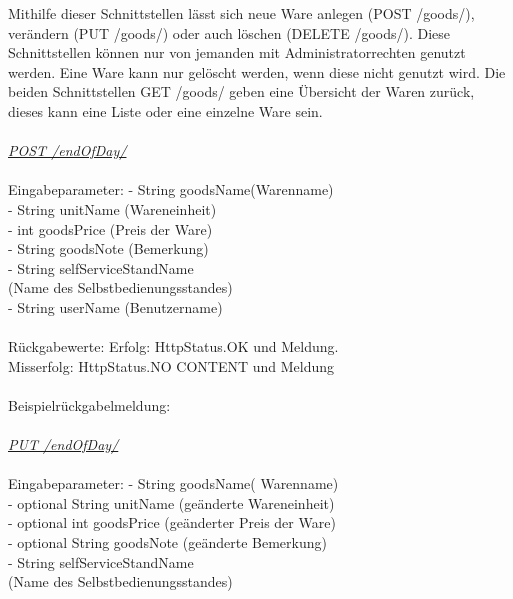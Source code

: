 Mithilfe dieser Schnittstellen lässt sich neue Ware anlegen (POST /goods/), verändern (PUT /goods/) oder auch löschen (DELETE /goods/). Diese Schnittstellen können nur von jemanden mit Administratorrechten genutzt werden. Eine Ware kann nur gelöscht werden, wenn diese nicht genutzt wird. Die beiden Schnittstellen GET /goods/ geben eine Übersicht der Waren zurück, dieses kann eine Liste oder eine einzelne Ware sein.
\\
\\
\textit{\underline{POST /endOfDay/}}
\\
\\
Eingabeparameter: \tab			- String goodsName(Warenname)\\
\tab \tab                        		- String unitName	(Wareneinheit)\\
\tab \tab                         		- int goodsPrice (Preis der Ware)\\
\tab \tab                         		- String goodsNote (Bemerkung)    \\                  
\tab \tab                         		- String selfServiceStandName \\
\tab \tab								 (Name des Selbstbedienungsstandes)\\
\tab \tab                        		- String userName (Benutzername)\\
\\
Rückgabewerte: \tab 					Erfolg: HttpStatus.OK und Meldung.\\
\tab \tab 								Misserfolg: HttpStatus.NO CONTENT und Meldung\\
\\
Beispielrückgabelmeldung:	
\\
\\
\textit{\underline{PUT /endOfDay/}}
\\
\\
Eingabeparameter: \tab			- String goodsName( Warenname)\\
\tab \tab                        		- optional String unitName	(geänderte Wareneinheit)\\
\tab \tab                         -	optional	int goodsPrice (geänderter Preis der Ware)\\
\tab \tab                         		- optional String goodsNote (geänderte Bemerkung)    \\                  
\tab \tab                         		- String selfServiceStandName \\
\tab \tab								(Name des Selbstbedienungsstandes)\\

